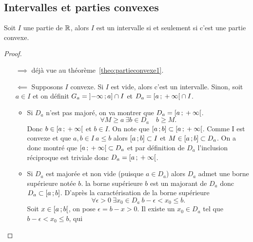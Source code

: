 \subsection{Intervalles et parties convexes}

\begin{theo}
  Soit \(I\) une partie de \(\mathbb{R}\), alors \(I\) est un intervalle si et seulement 
  si c'est une partie convexe.
\end{theo}
\begin{proof}
  \begin{itemize}
    \item[\(\implies\)] déjà vue au théorème~\ref{theo:partieconvexe1}.
    \item[\(\impliedby\)] Supposons \(I\) convexe. Si \(I\) est vide, alors 
      c'est un intervalle. Sinon, soit \(a\in I\) et on définit \(G_a = 
      \left]  - \infty \, ; {} a \right]\cap I\) et \(D_a = \left[ a \, ; {}  + 
      \infty \right[\cap I\).
      \begin{itemize}
        \item Si \(D_a\) n'est pas majoré, on va montrer que \(D_a = 
          \left[ a \, ; {}  + \infty \right[\).
          \begin{equation}
            \forall M \geqslant a \ \exists b \in D_a \quad b\geqslant M.
          \end{equation}
          Donc \(b\in \left[ a \, ; {}  + \infty \right[\) et \(b\in I\). On note que 
          \(\left[ a \, ; {} b \right]\subset \left[ a \, ; {}  + \infty \right[\). Comme I 
          est convexe et que \(a, b \in I \ a \leqslant b\) alors 
          \(\left[ a \, ; {} b \right]\subset I\) et \(M\in \left[ a \, ; {} b \right] \subset 
          D_a\). On a donc montré que \(\left[ a \, ; {}  + \infty \right[ \subset 
          D_a\) et par définition de \(D_a\) l'inclusion réciproque est triviale 
          donc \(D_a = \left[ a \, ; {}  + \infty \right[\).
        \item Si \(D_a\) est majorée et non vide (puisque \(a\in D_a\)) alors 
          \(D_a\) admet une borne supérieure notée \(b\). la borne supérieure 
          \(b\) est un majorant de \(D_a\) donc \(D_a \subset 
          \left[ a \, ; {} b \right]\). D'après la caractérisation de la borne 
          supérieure
          \begin{equation}
            \forall \epsilon >0 \ \exists x_0 \in D_a \ b - \epsilon < 
            x_0\leqslant b.
          \end{equation}
          Soit \(x\in \left[ a \, ; {} b \right[\), on pose \(\epsilon = b - x>0\). Il 
          existe un \(x_0\in D_a\) tel que \(b - \epsilon<x_0 \leqslant b\), qui 

\end{itemize}
\end{itemize}
\end{proof}
